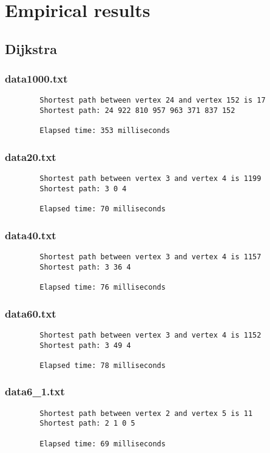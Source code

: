 \documentclass{article}
\begin{document}
    \section*{Empirical results}

    \subsection*{Dijkstra}
    \subsubsection*{data1000.txt}
    \begin{verbatim}
        Shortest path between vertex 24 and vertex 152 is 17
        Shortest path: 24 922 810 957 963 371 837 152

        Elapsed time: 353 milliseconds
    \end{verbatim}

    \subsubsection*{data20.txt}
    \begin{verbatim}
        Shortest path between vertex 3 and vertex 4 is 1199
        Shortest path: 3 0 4

        Elapsed time: 70 milliseconds
    \end{verbatim}

    \subsubsection*{data40.txt}
    \begin{verbatim}
        Shortest path between vertex 3 and vertex 4 is 1157
        Shortest path: 3 36 4

        Elapsed time: 76 milliseconds
    \end{verbatim}

    \subsubsection*{data60.txt}
    \begin{verbatim}
        Shortest path between vertex 3 and vertex 4 is 1152
        Shortest path: 3 49 4

        Elapsed time: 78 milliseconds
    \end{verbatim}

    \subsubsection*{data6\_1.txt}
    \begin{verbatim}
        Shortest path between vertex 2 and vertex 5 is 11
        Shortest path: 2 1 0 5

        Elapsed time: 69 milliseconds
    \end{verbatim}
\end{document}
